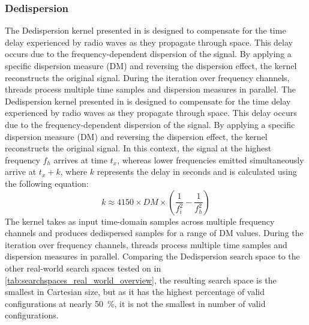 \subsubsection{Dedispersion} \label{subsubsec:evaluation_setup_kernel_dedispersion}
\iflackofspace
The Dedispersion kernel presented in \cite{BenchmarkingSuiteKerneltuners} is designed to compensate for the time delay experienced by radio waves as they propagate through space. This delay occurs due to the frequency-dependent dispersion of the signal. By applying a specific dispersion measure (DM) and reversing the dispersion effect, the kernel reconstructs the original signal.
During the iteration over frequency channels, threads process multiple time samples and dispersion measures in parallel.
\else
The Dedispersion kernel presented in \cite{BenchmarkingSuiteKerneltuners} is designed to compensate for the time delay experienced by radio waves as they propagate through space. This delay occurs due to the frequency-dependent dispersion of the signal. By applying a specific dispersion measure (DM) and reversing the dispersion effect, the kernel reconstructs the original signal. In this context, the signal at the highest frequency \(f_{h}\) arrives at time \(t_{x}\), whereas lower frequencies emitted simultaneously arrive at \(t_{x} + k\), where \(k\) represents the delay in seconds and is calculated using the following equation:
\begin{equation}
k \approx 4150 \times DM \times \left( \frac{1}{f_{i}^2} - \frac{1}{f_{h}^2} \right)
\end{equation}
The kernel takes as input time-domain samples across multiple frequency channels and produces dedispersed samples for a range of DM values. During the iteration over frequency channels, threads process multiple time samples and dispersion measures in parallel.
\fi
Comparing the Dedispersion search space to the other real-world search spaces tested on in \cref{tab:searchspaces_real_world_overview}, the resulting search space is the smallest in Cartesian size, but as it has the highest percentage of valid configurations at nearly 50~\%, it is not the smallest in number of valid configurations. 

